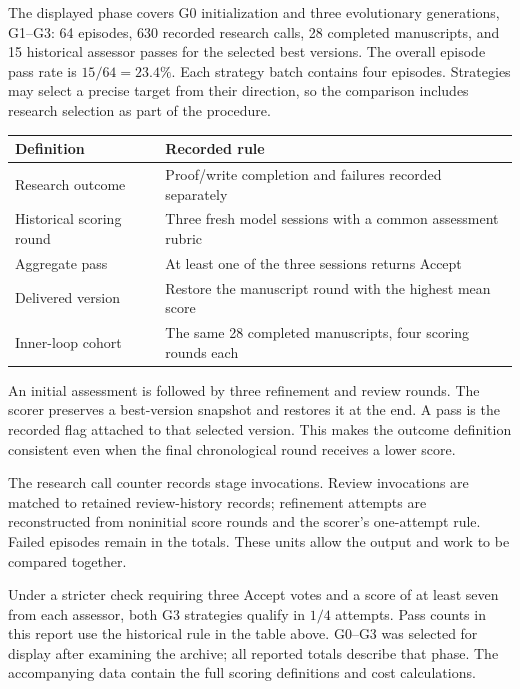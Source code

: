 The displayed phase covers G0 initialization and three evolutionary generations, G1--G3: 64 episodes, 630 recorded research calls, 28 completed manuscripts, and 15 historical assessor passes for the selected best versions. The overall episode pass rate is $15/64=23.4\%$. Each strategy batch contains four episodes. Strategies may select a precise target from their direction, so the comparison includes research selection as part of the procedure.
\begin{center}\small
\begin{tabularx}{\textwidth}{P{39mm}Y}
\toprule
\textbf{Definition} & \textbf{Recorded rule}\\
\midrule
Research outcome & Proof/write completion and failures recorded separately\\
Historical scoring round & Three fresh model sessions with a common assessment rubric\\
Aggregate pass & At least one of the three sessions returns Accept\\
Delivered version & Restore the manuscript round with the highest mean score\\
Inner-loop cohort & The same 28 completed manuscripts, four scoring rounds each\\
\bottomrule
\end{tabularx}
\end{center}
An initial assessment is followed by three refinement and review rounds. The scorer preserves a best-version snapshot and restores it at the end. A pass is the recorded flag attached to that selected version. This makes the outcome definition consistent even when the final chronological round receives a lower score.

The research call counter records stage invocations. Review invocations are matched to retained review-history records; refinement attempts are reconstructed from noninitial score rounds and the scorer's one-attempt rule. Failed episodes remain in the totals. These units allow the output and work to be compared together.

Under a stricter check requiring three Accept votes and a score of at least seven from each assessor, both G3 strategies qualify in $1/4$ attempts. Pass counts in this report use the historical rule in the table above. G0--G3 was selected for display after examining the archive; all reported totals describe that phase. The accompanying data contain the full scoring definitions and cost calculations.

